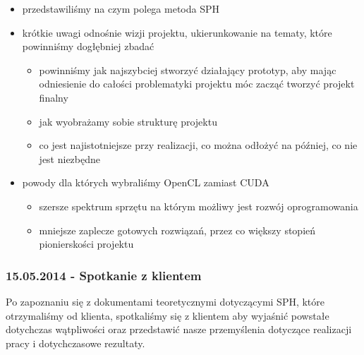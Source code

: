 \documentclass[polish, 12pt]{aghthesis}
\begin{document}
			\begin{itemize}
			
				\item przedstawiliśmy na czym polega metoda SPH
				\item krótkie uwagi odnośnie wizji projektu, ukierunkowanie na tematy, które powinniśmy dogłębniej zbadać
					\begin{itemize}
						\item powinniśmy jak najszybciej stworzyć działający prototyp, aby mając odniesienie do całości problematyki projektu móc zacząć tworzyć projekt finalny
						\item jak wyobrażamy sobie strukturę projektu
						\item co jest najistotniejsze przy realizacji, co można odłożyć na później, co nie jest niezbędne
					\end{itemize}
				\item powody dla których wybraliśmy OpenCL zamiast CUDA
					\begin{itemize}
						
						\item szersze spektrum sprzętu na którym możliwy jest rozwój oprogramowania
						\item mniejsze zaplecze gotowych rozwiązań, przez co większy stopień pionierskości projektu
						
					\end{itemize}
			
			\end{itemize}
			
		\subsubsection*{15.05.2014 - Spotkanie z klientem}
		
			Po zapoznaniu się z dokumentami teoretycznymi dotyczącymi SPH, które otrzymaliśmy od klienta, spotkaliśmy się z klientem aby wyjaśnić powstałe dotychczas wątpliwości oraz przedstawić nasze przemyślenia dotyczące realizacji pracy i dotychczasowe rezultaty.
			
\end{document}
